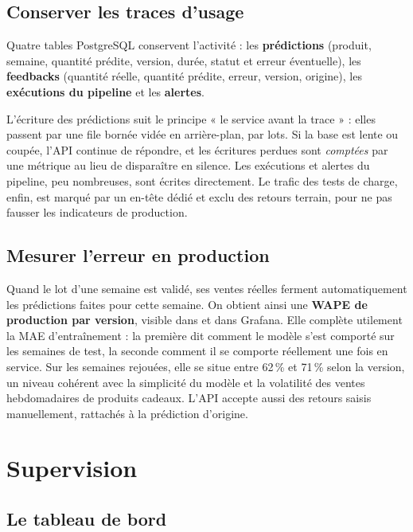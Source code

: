 \documentclass[11pt,a4paper]{article}
\newcommand{\code}[1]{\texttt{\detokenize{#1}}}
\begin{document}
\subsection{Conserver les traces d'usage}

Quatre tables PostgreSQL conservent l'activité : les \textbf{prédictions} (produit,
semaine, quantité prédite, version, durée, statut et erreur éventuelle), les
\textbf{feedbacks} (quantité réelle, quantité prédite, erreur, version, origine), les
\textbf{exécutions du pipeline} et les \textbf{alertes}.

L'écriture des prédictions suit le principe « le service avant la trace » : elles passent
par une file bornée vidée en arrière-plan, par lots. Si la base est lente ou coupée, l'API
continue de répondre, et les écritures perdues sont \emph{comptées} par une métrique au lieu
de disparaître en silence. Les exécutions et alertes du pipeline, peu nombreuses, sont
écrites directement. Le trafic des tests de charge, enfin, est marqué par un en-tête dédié
et exclu des retours terrain, pour ne pas fausser les indicateurs de production.

\subsection{Mesurer l'erreur en production}

Quand le lot d'une semaine est validé, ses ventes réelles ferment automatiquement les
prédictions faites pour cette semaine. On obtient ainsi une \textbf{WAPE de production par
version}, visible dans \code{/model} et dans Grafana. Elle complète utilement la MAE
d'entraînement : la première dit comment le modèle s'est comporté sur les semaines de test,
la seconde comment il se comporte réellement une fois en service. Sur les semaines rejouées,
elle se situe entre 62\,\% et 71\,\% selon la version, un niveau cohérent avec la simplicité
du modèle et la volatilité des ventes hebdomadaires de produits cadeaux. L'API accepte aussi
des retours saisis manuellement, rattachés à la prédiction d'origine.

\section{Supervision}\label{sec:supervision}

\subsection{Le tableau de bord}
\end{document}

